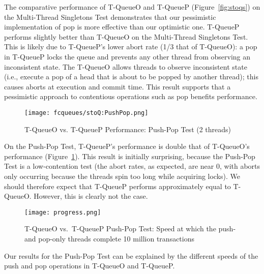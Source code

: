 The comparative performance of T-QueueO and T-QueueP (Figure~\ref{fig:stoqs}) on the Multi-Thread Singletons Test demonstrates that our pessimistic implementation of pop is more effective than our optimistic one. T-QueueP performs slightly better than T-QueueO on the Multi-Thread Singletons Test. This is likely due to T-QueueP's lower abort rate (1/3 that of T-QueueO): a pop in T-QueueP locks the queue and prevents any other thread from observing an inconsistent state. The T-QueueO allows threads to observe inconsistent state (i.e., execute a pop of a head that is about to be popped by another thread); this causes aborts at execution and commit time.
This result supports that a pessimistic approach to contentious operations such as pop benefits performance.

\begin{figure}[t]
    \centering
	\begin{minipage}{\textwidth}
        {\texttt{[image: fcqueues/stoQ:PushPop.png]}}
	\end{minipage}
    \caption{T-QueueO vs. T-QueueP Performance: Push-Pop Test (2 threads)}
    \label{fig:stoqs_pp}
\end{figure}

    On the Push-Pop Test, T-QueueP's performance is double that of T-QueueO's performance (Figure~\ref{fig:stoqs_pp}). This result is initially surprising, because the Push-Pop Test is a low-contention test (the abort rates, as expected, are near 0, with aborts only occurring because the threads spin too long while acquiring locks). We should therefore expect that T-QueueP performs approximately equal to T-QueueO. However, this is clearly not the case.

\begin{figure}[t]
    \centering
        {\texttt{[image: progress.png]}}
    \caption{T-QueueO vs.\ T-QueueP Push-Pop Test: Speed at which the push- and pop-only threads complete 10 million transactions}
    \label{fig:sto_progress}
\end{figure}

Our results for the Push-Pop Test can be explained by the different speeds of the push and pop operations in T-QueueO and T-QueueP. 

